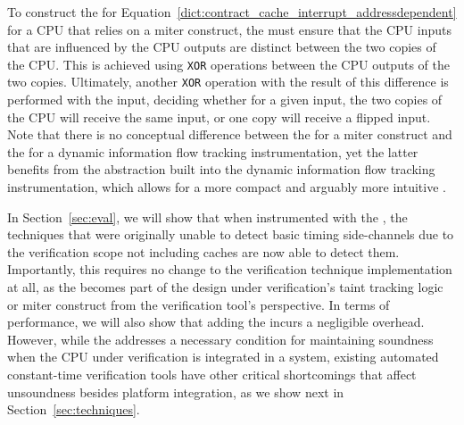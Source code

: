 To construct the \PICI for Equation~\ref{dict:contract_cache_interrupt_addressdependent} for a CPU that relies on a miter construct, the \PICI must ensure that the CPU inputs that are influenced by the CPU outputs are distinct between the two copies of the CPU.
This is achieved using \texttt{XOR} operations between the CPU outputs of the two copies.
Ultimately, another \texttt{XOR} operation with the result of this difference is performed with the input, deciding whether for a given input, the two copies of the CPU will receive the same input, or one copy will receive a flipped input.
Note that there is no conceptual difference between the \PICI for a miter construct and the \PICI for a dynamic information flow tracking instrumentation, yet the latter benefits from the abstraction built into the dynamic information flow tracking instrumentation, which allows for a more compact and arguably more intuitive \PICI.

In Section~\ref{sec:eval}, we will show that when instrumented with the \PICI, the techniques that were originally unable to detect basic timing side-channels due to the verification scope not including caches are now able to detect them.
Importantly, this requires no change to the verification technique implementation at all, as the \PICI becomes part of the design under verification's taint tracking logic or miter construct from the verification tool's perspective.
In terms of performance, we will also show that adding the \PICI incurs a negligible overhead.
However, while the \PICI addresses a necessary condition for maintaining soundness when the CPU under verification is integrated in a system, existing automated constant-time verification tools have other critical shortcomings that affect unsoundness besides platform integration, as we show next in Section~\ref{sec:techniques}.
